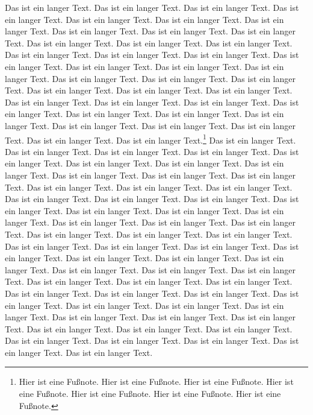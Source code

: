 \documentclass{article}
\begin{document}
Das ist ein langer Text. Das ist ein langer Text.
Das ist ein langer Text. Das ist ein langer Text.
Das ist ein langer Text. Das ist ein langer Text.
Das ist ein langer Text. Das ist ein langer Text.
Das ist ein langer Text. Das ist ein langer Text.
Das ist ein langer Text. Das ist ein langer Text.
Das ist ein langer Text. Das ist ein langer Text.
Das ist ein langer Text. Das ist ein langer Text.
Das ist ein langer Text. Das ist ein langer Text.
Das ist ein langer Text. Das ist ein langer Text.
Das ist ein langer Text. Das ist ein langer Text.
Das ist ein langer Text. Das ist ein langer Text.
Das ist ein langer Text. Das ist ein langer Text.
Das ist ein langer Text. Das ist ein langer Text.
Das ist ein langer Text. Das ist ein langer Text.
Das ist ein langer Text. Das ist ein langer Text.
Das ist ein langer Text. Das ist ein langer Text.
Das ist ein langer Text. Das ist ein langer Text.
Das ist ein langer Text. Das ist ein langer Text.\footnote{%
  Hier ist eine Fu\ss note. Hier ist eine Fu\ss note.
  Hier ist eine Fu\ss note. Hier ist eine Fu\ss note.
  Hier ist eine Fu\ss note. Hier ist eine Fu\ss note.
  Hier ist eine Fu\ss note.}
Das ist ein langer Text. Das ist ein langer Text.
Das ist ein langer Text. Das ist ein langer Text.
Das ist ein langer Text. Das ist ein langer Text.
Das ist ein langer Text. Das ist ein langer Text.
Das ist ein langer Text. Das ist ein langer Text.
Das ist ein langer Text. Das ist ein langer Text.
Das ist ein langer Text. Das ist ein langer Text.
Das ist ein langer Text. Das ist ein langer Text.
Das ist ein langer Text. Das ist ein langer Text.
Das ist ein langer Text. Das ist ein langer Text.
Das ist ein langer Text. Das ist ein langer Text.
Das ist ein langer Text. Das ist ein langer Text.
Das ist ein langer Text. Das ist ein langer Text.
Das ist ein langer Text. Das ist ein langer Text.
Das ist ein langer Text. Das ist ein langer Text.
Das ist ein langer Text. Das ist ein langer Text.
Das ist ein langer Text. Das ist ein langer Text.
Das ist ein langer Text. Das ist ein langer Text.
Das ist ein langer Text. Das ist ein langer Text.
Das ist ein langer Text. Das ist ein langer Text.
Das ist ein langer Text. Das ist ein langer Text.
Das ist ein langer Text. Das ist ein langer Text.
Das ist ein langer Text. Das ist ein langer Text.
Das ist ein langer Text. Das ist ein langer Text.
Das ist ein langer Text. Das ist ein langer Text.
Das ist ein langer Text. Das ist ein langer Text.
Das ist ein langer Text. Das ist ein langer Text.
Das ist ein langer Text. Das ist ein langer Text.
Das ist ein langer Text. Das ist ein langer Text.
\end{document}
